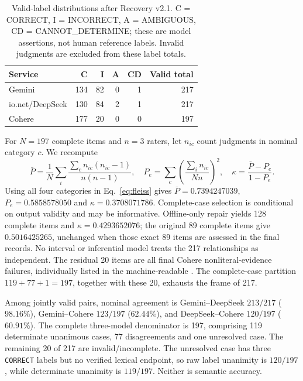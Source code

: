 \begin{table}[htbp]\centering\small
\caption{Valid-label distributions after Recovery v2.1. C = CORRECT, I = INCORRECT, A = AMBIGUOUS, CD = CANNOT\_DETERMINE; these are model assertions, not human reference labels. Invalid judgments are excluded from these label totals.}\label{tab:relationship-labels}
\begin{tabular}{@{}lrrrrr@{}}\toprule
Service & C & I & A & CD & Valid total\\\midrule
Gemini & 134 & 82 & 0 & 1 & 217\\
io.net/DeepSeek & 130 & 84 & 2 & 1 & 217\\
Cohere & 177 & 20 & 0 & 0 & 197\\\bottomrule
\end{tabular}\end{table}

For $N=197$ complete items and $n=3$ raters, let $n_{ic}$ count judgments in nominal category $c$. We recompute
\begin{equation}
\bar P=\frac{1}{N}\sum_i\frac{\sum_c n_{ic}(n_{ic}-1)}{n(n-1)},\quad
P_e=\sum_c\left(\frac{\sum_i n_{ic}}{Nn}\right)^2,\quad
\kappa=\frac{\bar P-P_e}{1-P_e}.
\label{eq:fleiss}
\end{equation}
Using all four categories in Eq.~\eqref{eq:fleiss} gives $\bar P=0.7394247039$, $P_e=0.5858578050$ and $\kappa=0.3708071786$. Complete-case selection is conditional on output validity and may be informative. Offline-only repair yields 128 complete items and $\kappa=0.4293652076$; the original 89 complete items give $0.5016425265$, unchanged when those exact 89 items are assessed in the final records. No interval or inferential model treats the 217 relationships as independent. The residual 20 items are all final Cohere nonliteral-evidence failures, individually listed in the machine-readable . The complete-case partition $119+77+1=197$, together with these 20, exhausts the frame of 217.

Among jointly valid pairs, nominal agreement is Gemini--DeepSeek $213/217$ ($98.16\%$), Gemini--Cohere $123/197$ ($62.44\%$), and DeepSeek--Cohere $120/197$ ($60.91\%$). The complete three-model denominator is 197, comprising 119 determinate unanimous cases, 77 disagreements and one unresolved case. The remaining 20 of 217 are invalid/incomplete. The unresolved case has three \texttt{CORRECT} labels but no verified lexical endpoint, so raw label unanimity is $120/197$, while determinate unanimity is $119/197$. Neither is semantic accuracy.

